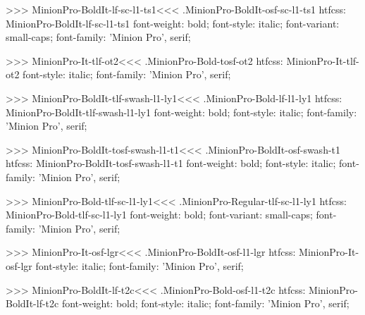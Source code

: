 {>>>
\<MinionPro-BoldIt-lf-sc-l1-ts1\><<<
.MinionPro-BoldIt-osf-sc-l1-ts1
htfcss:  MinionPro-BoldIt-lf-sc-l1-ts1  font-weight: bold; font-style: italic; font-variant: small-caps; font-family: 'Minion Pro', serif;

>>>
\<MinionPro-It-tlf-ot2\><<<
.MinionPro-Bold-tosf-ot2
htfcss:  MinionPro-It-tlf-ot2  font-style: italic; font-family: 'Minion Pro', serif;

>>>
\<MinionPro-BoldIt-tlf-swash-l1-ly1\><<<
.MinionPro-Bold-lf-l1-ly1
htfcss:  MinionPro-BoldIt-tlf-swash-l1-ly1  font-weight: bold; font-style: italic; font-family: 'Minion Pro', serif;

>>>
\<MinionPro-BoldIt-tosf-swash-l1-t1\><<<
.MinionPro-BoldIt-osf-swash-t1
htfcss:  MinionPro-BoldIt-tosf-swash-l1-t1  font-weight: bold; font-style: italic; font-family: 'Minion Pro', serif;

>>>
\<MinionPro-Bold-tlf-sc-l1-ly1\><<<
.MinionPro-Regular-tlf-sc-l1-ly1
htfcss:  MinionPro-Bold-tlf-sc-l1-ly1  font-weight: bold; font-variant: small-caps; font-family: 'Minion Pro', serif;

>>>
\<MinionPro-It-osf-lgr\><<<
.MinionPro-BoldIt-osf-l1-lgr
htfcss:  MinionPro-It-osf-lgr  font-style: italic; font-family: 'Minion Pro', serif;

>>>
\<MinionPro-BoldIt-lf-t2c\><<<
.MinionPro-Bold-osf-l1-t2c
htfcss:  MinionPro-BoldIt-lf-t2c  font-weight: bold; font-style: italic; font-family: 'Minion Pro', serif;

}
